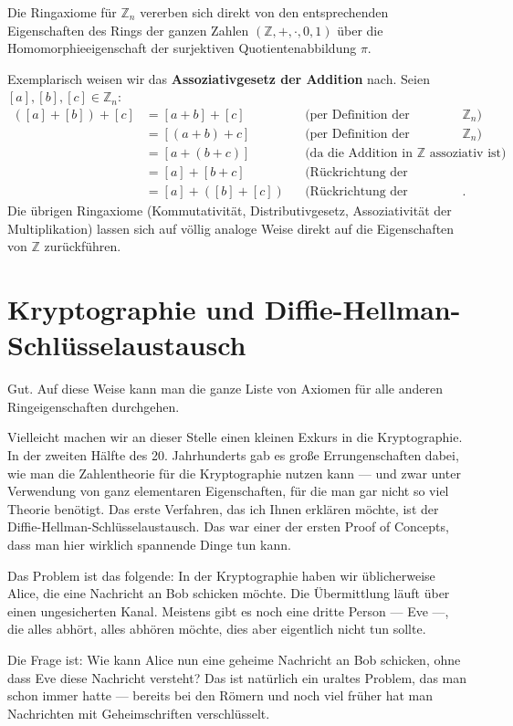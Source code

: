 \begin{math-stroke}
\begin{short-proof}
Die Ringaxiome für $\mathbb{Z}_n$ vererben sich direkt von den entsprechenden Eigenschaften des Rings der ganzen Zahlen $(\mathbb{Z}, +, \cdot, 0, 1)$ über die Homomorphieeigenschaft der surjektiven Quotientenabbildung $\pi$.

Exemplarisch weisen wir das \textbf{Assoziativgesetz der Addition} nach. Seien $[a], [b], [c] \in \mathbb{Z}_n$:
\begin{align*}
([a] + [b]) + [c] &= [a + b] + [c] && \text{(per Definition der Addition in $\mathbb{Z}_n$)} \\
&= [(a + b) + c] && \text{(per Definition der Addition in $\mathbb{Z}_n$)} \\
&= [a + (b + c)] && \text{(da die Addition in $\mathbb{Z}$ assoziativ ist)} \\
&= [a] + [b + c] && \text{(Rückrichtung der Definition)} \\
&= [a] + ([b] + [c]) && \text{(Rückrichtung der Definition)}.
\end{align*}
Die übrigen Ringaxiome (Kommutativität, Distributivgesetz, Assoziativität der Multiplikation) lassen sich auf völlig analoge Weise direkt auf die Eigenschaften von $\mathbb{Z}$ zurückführen.
\end{short-proof}
\end{math-stroke}

\section{Kryptographie und Diffie-Hellman-Schlüsselaustausch}

\begin{spoken-clean}[00:13:25 - 00:15:10]
Gut. Auf diese Weise kann man die ganze Liste von Axiomen für alle anderen Ringeigenschaften durchgehen.

Vielleicht machen wir an dieser Stelle einen kleinen Exkurs in die Kryptographie. In der zweiten Hälfte des 20. Jahrhunderts gab es große Errungenschaften dabei, wie man die Zahlentheorie für die Kryptographie nutzen kann --- und zwar unter Verwendung von ganz elementaren Eigenschaften, für die man gar nicht so viel Theorie benötigt. Das erste Verfahren, das ich Ihnen erklären möchte, ist der Diffie-Hellman-Schlüsselaustausch. Das war einer der ersten Proof of Concepts, dass man hier wirklich spannende Dinge tun kann.

Das Problem ist das folgende: In der Kryptographie haben wir üblicherweise Alice, die eine Nachricht an Bob schicken möchte. Die Übermittlung läuft über einen ungesicherten Kanal. Meistens gibt es noch eine dritte Person --- Eve ---, die alles abhört, alles abhören möchte, dies aber eigentlich nicht tun sollte.

Die Frage ist: Wie kann Alice nun eine geheime Nachricht an Bob schicken, ohne dass Eve diese Nachricht versteht? Das ist natürlich ein uraltes Problem, das man schon immer hatte --- bereits bei den Römern und noch viel früher hat man Nachrichten mit Geheimschriften verschlüsselt.
\end{spoken-clean}

